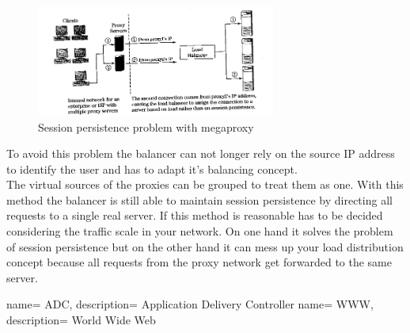 \documentclass[12p]{article}
\begin{document}
	\begin{figure}[h!]
		\centering
		\includegraphics[width=0.7\textwidth]{img/SessionPersistanceProblem.png}
		\caption{Session persistence problem with megaproxy}
	\end{figure}
	
	To avoid this problem the balancer can not longer rely on the source IP address to identify the user and has to adapt it's balancing concept.\\
	The virtual sources of the proxies can be grouped to treat them as one. With this method the balancer is still able to maintain session persistence by directing all requests to a single real server. If this method is reasonable has to be decided considering the traffic scale in your network. On one hand it solves the problem of session persistence but on the other hand it can mess up your load distribution concept because all requests from the proxy network get forwarded to the same server.
	
	\newpage
	 {
		name= ADC,
		description= {Application Delivery Controller}
	}
	 {
		name= WWW,
		description= {World Wide Web}
	}
	\printglossaries
	
	\newpage
	
	
	
	\newpage
\end{document}
